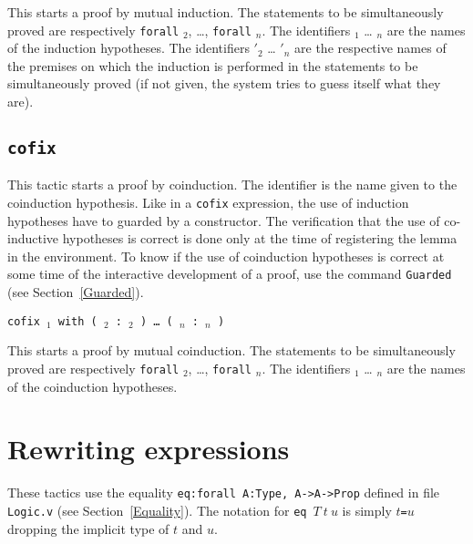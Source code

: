 \begin{coq_example*}
\begin{Variants}
This starts a proof by mutual induction. The statements to be
simultaneously proved are respectively {\tt forall}
   {\type}$_2$, {\ldots}, {\tt forall}
   {\type}$_n$.  The identifiers
{\ident}$_1$ {\ldots} {\ident}$_n$ are the names of the induction
hypotheses. The identifiers {\ident}$'_2$ {\ldots} {\ident}$'_n$ are the
respective names of the premises on which the induction is performed
in the statements to be simultaneously proved (if not given, the
system tries to guess itself what they are).

\end{Variants}

\subsection{\tt cofix \ident}
\label{tactic:cofix}

This tactic starts a proof by coinduction. The identifier {\ident} is
the name given to the coinduction hypothesis.  Like in a {\tt cofix}
expression, the use of induction hypotheses have to guarded by a
constructor.  The verification that the use of co-inductive hypotheses
is correct is done only at the time of registering the lemma in the
environment. To know if the use of coinduction hypotheses is correct
at some time of the interactive development of a proof, use the
command {\tt Guarded} (see Section~\ref{Guarded}).


\begin{Variants}
  \item {\tt cofix \ident$_1$ with ( \ident$_2$
     :~\type$_2$ ) \dots\ (
    \ident$_n$  :~\type$_n$ )}

This starts a proof by mutual coinduction. The statements to be
simultaneously proved are respectively {\tt forall}
 {\type}$_2$, {\ldots}, {\tt forall}
   {\type}$_n$. The identifiers
    {\ident}$_1$ {\ldots} {\ident}$_n$ are the names of the
    coinduction hypotheses.

\end{Variants}

\section{Rewriting expressions}


These tactics use the equality {\tt eq:forall A:Type, A->A->Prop}
defined in file {\tt Logic.v} (see Section~\ref{Equality}). The
notation for {\tt eq}~$T~t~u$ is simply {\tt $t$=$u$} dropping the
implicit type of $t$ and $u$.


\end{coq_example*}
